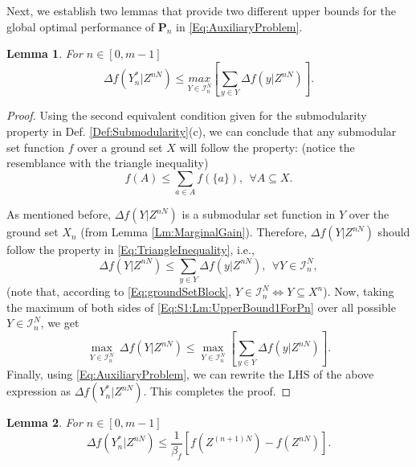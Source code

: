 \documentclass[conference]{IEEEtran}
\newtheorem{lemma}{Lemma}
\begin{document}

Next, we establish two lemmas that provide two different upper bounds for the global optimal performance of $\mathbf{P}_n$ in \eqref{Eq:AuxiliaryProblem}.
\begin{lemma}\label{Lm:UpperBound1ForPn} 
For $n\in[0,m-1]$
\begin{equation}\label{Eq:Lm:UpperBound1ForPn}
\Delta f(Y^*_n\vert Z^{nN}) \leq  \underset{Y\in\mathcal{I}^N_n}{max} \left[ \sum_{y\in Y} \Delta f(y\vert Z^{nN}) \right].
\end{equation}
\end{lemma}

\begin{proof}
Using the second equivalent condition given for the submodularity property in Def. \ref{Def:Submodularity}(c), we can conclude that any submodular set function $f$ over a ground set $X$ will follow the property: (notice the resemblance with the triangle inequality)
\begin{equation}\label{Eq:TriangleInequality}
    f(A)\leq \sum_{a \in A} f(\{a\}), \ \ \forall A \subseteq X.
\end{equation}

As mentioned before, $\Delta f(Y \vert Z^{nN})$ is a submodular set function in $Y$ over the ground set $X_n$ (from Lemma \ref{Lm:MarginalGain}). Therefore, $\Delta f(Y \vert Z^{nN})$ should follow the property in \eqref{Eq:TriangleInequality}, i.e., 
\begin{equation}\label{Eq:S1:Lm:UpperBound1ForPn}
    \Delta f(Y \vert Z^{nN}) \leq \sum_{y \in Y} \Delta f(y\vert Z^{nN}),\ \ \forall Y \in \mathcal{I}^N_n, 
\end{equation}
(note that, according to \eqref{Eq:groundSetBlock}, $Y \in \mathcal{I}^N_n \iff Y \subseteq X^n$). Now, taking the maximum of both sides of \eqref{Eq:S1:Lm:UpperBound1ForPn} over all possible $Y \in \mathcal{I}^N_n$, we get 
\begin{equation}
    \underset{Y\in\mathcal{I}^N_n}{\max}\ \Delta f(Y \vert Z^{nN}) \leq \underset{Y\in\mathcal{I}^N_n}{\max} \left[\sum_{y \in Y} \Delta f(y\vert Z^{nN})\right].
\end{equation}
Finally, using \eqref{Eq:AuxiliaryProblem}, we can rewrite the LHS of the above expression as $\Delta f(Y^*_n\vert Z^{nN})$. This completes the proof. \end{proof}





\begin{lemma} \label{Lm:UpperBound2ForPn}
For $n\in [0,m-1]$
\begin{equation} \label{Eq:Lm:UpperBound2ForPn}
\Delta f(Y^*_n\vert Z^{nN}) \leq  \frac{1}{\beta_f}\left[ f(Z^{(n+1)N})-f(Z^{nN})\right].      
\end{equation}
\end{lemma}
\end{document}
